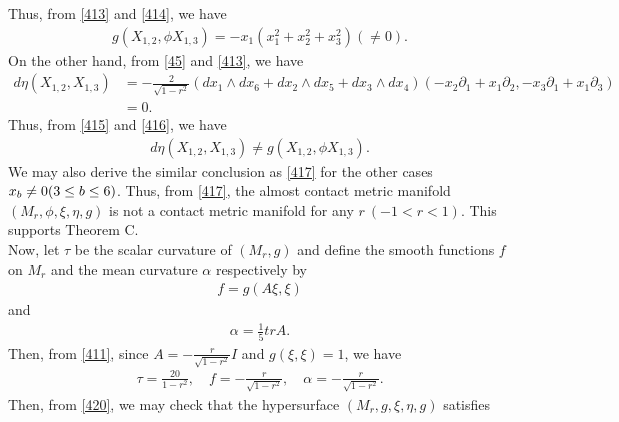 \documentclass[12pt]{article}
\numberwithin{equation}{section}
\begin{document}
Thus, from \eqref{413} and \eqref{414}, we have
\begin{equation}\label{415}
\begin{split}
g(X_{1, 2}, \phi X_{1, 3})=-x_1(x_1^2+x_2^2+x_3^2) (\neq 0).
\end{split}
\end{equation}
On the other hand, from \eqref{45} and \eqref{413}, we have
\begin{equation}\label{416}
\begin{split}
d\eta(X_{1, 2}, X_{1, 3})&=-\frac{2}{\sqrt{1-r^2}}(dx_1\wedge
dx_6+dx_2\wedge dx_5+dx_3\wedge
dx_4)(-x_2\partial_1+x_1\partial_2, -x_3\partial_1+x_1\partial_3)\\
&=0.
\end{split}
\end{equation}
Thus, from \eqref{415} and \eqref{416}, we have
\begin{equation}\label{417}
\begin{split}
d\eta(X_{1, 2}, X_{1, 3})\neq g(X_{1, 2}, \phi X_{1, 3}).
\end{split}
\end{equation}
We may also derive the similar conclusion as \eqref{417} for the
other cases $x_b \neq 0\\ (3\leq b \leq 6)$. Thus, from
\eqref{417}, the almost contact metric manifold $(M_{r},\phi, \xi, \eta, g)$ is not a contact metric manifold for any $r~(-1<r<1)$. This supports Theorem C.\\
Now, let $\tau$ be the scalar curvature of $(M_{r}, g)$ and define the
smooth functions $f$ on $M_r$ and the mean curvature $\alpha$ respectively by
\begin{equation}\label{418}
\begin{split}
f=g(A\xi, \xi)
\end{split}
\end{equation}
and
\begin{equation}\label{419}
\begin{split}
\alpha=\frac{1}{5}trA.
\end{split}
\end{equation}
Then, from \eqref{411}, since $A=-\frac{r}{\sqrt{1-r^2}}I$ and
$g(\xi, \xi)=1$, we have
\begin{equation}\label{420}
\begin{split}
\tau=\frac{20}{1-r^2}, \quad f=-\frac{r}{\sqrt{1-r^2}}, \quad
\alpha=-\frac{r}{\sqrt{1-r^2}}.
\end{split}
\end{equation}
Then, from \eqref{420}, we may check that the hypersurface $(M_{r}, g, \xi,\eta,g)$ satisfies
\end{document}
